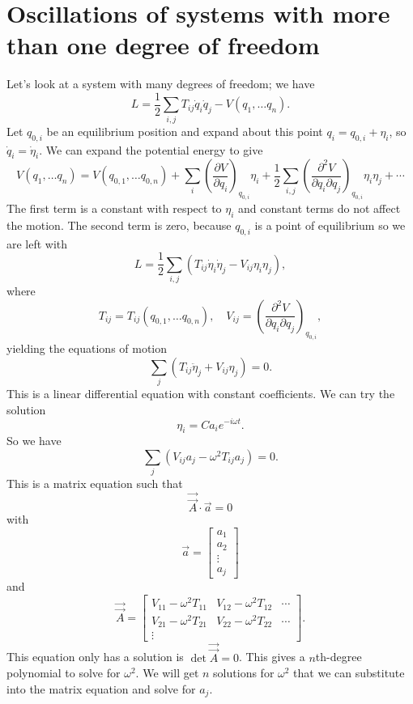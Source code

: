 \section{Oscillations of systems with more than one degree of freedom}
Let's look at a system with many degrees of freedom; we have
\[L={\frac {1}{2}}\sum _{i,j}T_{ij}{\dot {q}}_{i}{\dot {q}}_{j}-V\left(q_{1},\ldots q_{n}\right).\]
Let $q_{0,i}$ be an equilibrium position and expand about this point $q_{i}=q_{0,i}+\eta _{i}$, so $\dot{q}_{i}=\dot {\eta }_{i}$.
We can expand the potential energy to give
\[V\left(q_{1},\ldots q_{n}\right)=V\left(q_{0,1},\ldots q_{0,n}\right)+\sum _{i}\left({\frac {\partial V}{\partial q_{i}}}\right)_{q_{0,i}}\eta _{i}+{\frac {1}{2}}\sum _{i,j}\left({\frac {\partial ^{2}V}{\partial q_{i}\partial q_{j}}}\right)_{q_{0,i}}\eta _{i}\eta _{j}+\cdots \]
The first term is a constant with respect to $\eta_i$ and constant terms do not affect the motion. The second term is zero, because $q_{0,i}$ is a point of equilibrium so we are left with
\[L={\frac {1}{2}}\sum _{i,j}\left(T_{ij}{\dot {\eta }}_{i}{\dot {\eta }}_{j}-V_{ij}\eta _{i}\eta _{j}\right), \]
where
\[T_{ij}=T_{ij}\left(q_{0,1},\ldots q_{0,n}\right) ,\quad V_{ij}=\left({\frac {\partial ^{2}V}{\partial q_{i}\partial q_{j}}}\right)_{q_{0,i}},\]
yielding the equations of motion
\[\sum _{j}\left(T_{ij}{\ddot {\eta }}_{j} + V_{ij}\eta _{j}\right)=0.\]
This is a linear differential equation with constant coefficients. We can try the solution
\[\eta _{i}=Ca_{i}e^{-i\omega t}.\]
So we have
\[\sum _{j}\left(V_{ij}a_{j}-\omega ^{2}T_{ij}a_{j}\right)=0.\]
This is a matrix equation such that
\[{\vec {\vec {A}}}\cdot {\vec {a}}=0 \]
with
\[{\vec {a}}=\left[{\begin{matrix}a_{1}\\a_{2}\\\vdots \\a_{j}\end{matrix}}\right] \]
and
\[{\vec {\vec {A}}}=\left[{\begin{matrix}V_{11}-\omega ^{2}T_{11}&V_{12}-\omega ^{2}T_{12}&\cdots \\V_{21}-\omega ^{2}T_{21}&V_{22}-\omega ^{2}T_{22}&\cdots \\\vdots &&\end{matrix}}\right].\]
This equation only has a solution is $\det {\vec {\vec {A}}}=0$. This gives a $n$th-degree polynomial to solve for $\omega^2$. We will get $n$ solutions for $\omega^2$ that we can substitute into the matrix equation and solve for $a_j$.


